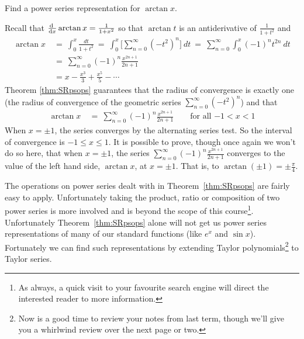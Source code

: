 \begin{eg}[$\arctan x$]\label{eg:SRpsrepD}
Find a power series representation for $\arctan x$.

\soln
Recall that $\diff{}{x}\arctan x = \frac{1}{1+x^2}$ so that
$\arctan t$ is an antiderivative of $\frac{1}{1+t^2}$ and
\begin{align*}
\arctan x\ &=\ \int_0^x \frac{dt}{1+t^2}
             \ =\  \int_0^x\Big[\sum_{n=0}^\infty {(-t^2)}^n\Big]\ dt
             \ =\  \sum_{n=0}^\infty \int_0^x (-1)^n t^{2n}\ dt \\
             &=\ \sum_{n=0}^\infty (-1)^n\frac{x^{2n+1}}{2n+1} \\
             &=x -\frac{x^3}{3} +\frac{x^5}{5}-\cdots
\end{align*}
Theorem \ref{thm:SRpsops} guarantees that the radius of convergence is
exactly one (the radius of convergence of the geometric series
$\sum_{n=0}^\infty (-t^2)^n$) and that
\begin{align*}
\arctan x\ &=\ \sum_{n=0}^\infty (-1)^n\frac{x^{2n+1}}{2n+1}
\qquad\text{for all $-1<x<1$}
\end{align*}
When $x=\pm 1$, the series converges by the alternating series test.
So the interval of convergence is $-1\le x\le 1$.
It is possible to prove, though once again we won't do so here,
that when $x=\pm 1$, the series
$\sum_{n=0}^\infty (-1)^n\frac{x^{2n+1}}{2n+1}$
converges to the value of the left hand side, $\arctan x$, at $x=\pm 1$.
That is, to $\arctan(\pm 1)=\pm \frac{\pi}{4}$.
\end{eg}

The operations on power series dealt with in Theorem~\ref{thm:SRpsops}
are fairly easy to apply. Unfortunately taking the product, ratio
or composition of two power series is more involved and is beyond
the scope of this course\footnote{As always, a quick visit to your
favourite search engine will direct the interested reader to more information.}.
Unfortunately Theorem~\ref{thm:SRpsops} alone will not get us
power series representations of many of our standard  functions
(like  $e^x$ and $\sin x$).  Fortunately we can find such
representations by extending Taylor polynomials\footnote{Now is a good
time to review your notes from last term, though  we'll give you a
whirlwind review over the next page or two.} to Taylor series.


